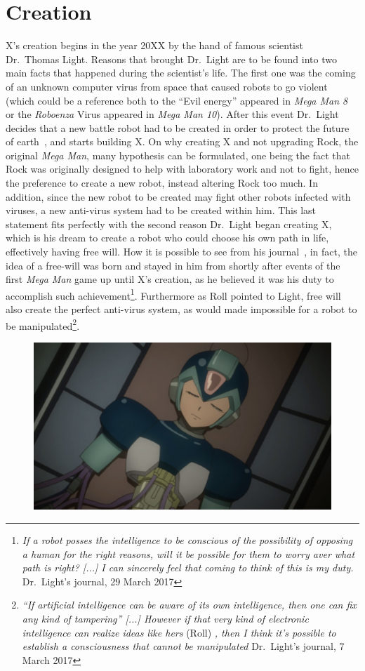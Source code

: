 \section{Creation}
X's creation begins in the year 20XX by the hand of famous scientist Dr.~Thomas Light. Reasons that brought Dr.~Light are to be found into two main facts that happened during the scientist's life. The first one was the coming of an unknown computer virus from space that caused robots to go violent (which could be a reference both to the ``Evil energy'' appeared in \emph{Mega Man 8} or the \textit{Roboenza} Virus appeared in \emph{Mega Man 10}). After this event Dr.~Light decides that a new battle robot had to be created in order to protect the future of earth~\cite{mega_man_network:Zero_timeline}, and starts building X. On why creating X and not upgrading Rock, the original \textit{Mega Man}, many hypothesis can be formulated, one being the fact that Rock was originally designed to help with laboratory work and not to fight, hence the preference to create a new robot, instead altering Rock too much. In addition, since the new robot to be created may fight other robots infected with viruses, a new anti-virus system had to be created within him. This last statement fits perfectly with the second reason Dr.~Light began creating X, which is his dream to create a robot who could choose his own path in life, effectively having free will. How it is possible to see from his journal~\cite{Dr.Light_journal}, in fact, the idea of a free-will was born and stayed in him from shortly after events of the first \textit{Mega Man} game up until X's creation, as he believed it was his duty to accomplish such achievement\footnote{\textit{If a robot posses the intelligence to be conscious of the possibility of opposing a human for the right reasons, will it be possible for them to worry aver what path is right? [...] I can sincerely feel that coming to think of this is my duty.} Dr.~Light's journal, 29 March 2017}. Furthermore as Roll pointed to Light, free will also create the perfect anti-virus system, as would made impossible for a robot to be manipulated\footnote{\textit{``If artificial intelligence can be aware of its own intelligence, then one can fix any kind of tampering'' [...] However if that very kind of electronic intelligence can realize ideas like hers} (Roll) \textit{, then I think it's possible to establish a consciousness that cannot be manipulated} Dr.~Light's journal, 7 March 2017}. 
\begin{figure}[htp]
	\centering
	\includegraphics[width=0.7\linewidth]{figures/Characters/Char_X_build.jpg}
\end{figure}
